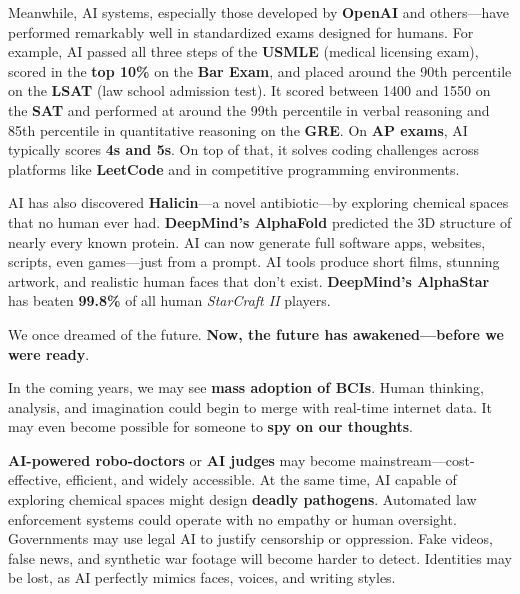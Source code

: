 \documentclass[a4paper,10pt,twocolumn]{memoir}
\begin{document}
{Meanwhile, AI systems, especially those developed by \textbf{OpenAI} and others—have performed remarkably well in standardized exams designed for humans. For example, AI passed all three steps of the \textbf{USMLE} (medical licensing exam), scored in the \textbf{top 10\%} on the \textbf{Bar Exam}, and placed around the 90th percentile on the \textbf{LSAT} (law school admission test). It scored between 1400 and 1550 on the \textbf{SAT} and performed at around the 99th percentile in verbal reasoning and 85th percentile in quantitative reasoning on the \textbf{GRE}. On \textbf{AP exams}, AI typically scores \textbf{4s and 5s}. On top of that, it solves coding challenges across platforms like \textbf{LeetCode} and in competitive programming environments.

AI has also discovered \textbf{Halicin}—a novel antibiotic—by exploring chemical spaces that no human ever had. \textbf{DeepMind’s AlphaFold} predicted the 3D structure of nearly every known protein. AI can now generate full software apps, websites, scripts, even games—just from a prompt. AI tools produce short films, stunning artwork, and realistic human faces that don’t exist. \textbf{DeepMind’s AlphaStar} has beaten \textbf{99.8\%} of all human \textit{StarCraft II} players.

We once dreamed of the future. \textbf{Now, the future has awakened—before we were ready}.

In the coming years, we may see \textbf{mass adoption of BCIs}. Human thinking, analysis, and imagination could begin to merge with real-time internet data. It may even become possible for someone to \textbf{spy on our thoughts}.

\textbf{AI-powered robo-doctors} or \textbf{AI judges} may become mainstream—cost-effective, efficient, and widely accessible. At the same time, AI capable of exploring chemical spaces might design \textbf{deadly pathogens}. Automated law enforcement systems could operate with no empathy or human oversight. Governments may use legal AI to justify censorship or oppression. Fake videos, false news, and synthetic war footage will become harder to detect. Identities may be lost, as AI perfectly mimics faces, voices, and writing styles.

}
\end{document}
